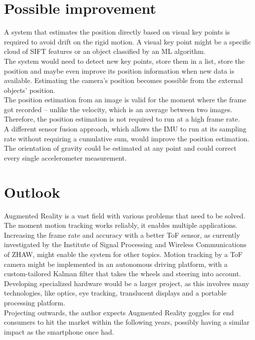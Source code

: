 \section{Possible improvement}
\label{sec:improvement}
A system that estimates the position directly based on visual key points is required to avoid drift on the rigid motion. A visual key point might be a specific cloud of SIFT features or an object classified by an ML algorithm.\\
The system would need to detect new key points, store them in a list, store the position and maybe even improve its position information when new data is available. Estimating the camera's position becomes possible from the external objects' position.\\
The position estimation from an image is valid for the moment where the frame got recorded – unlike the velocity, which is an average between two images. Therefore, the position estimation is not required to run at a high frame rate.\\
A different sensor fusion approach, which allows the IMU to run at its sampling rate without requiring a cumulative sum, would improve the position estimation. The orientation of gravity could be estimated at any point and could correct every single accelerometer measurement.
 

\section{Outlook}
\label{sec:outlook}
Augmented Reality is a vast field with various problems that need to be solved. The moment motion tracking works reliably, it enables multiple applications. Increasing the frame rate and accuracy with a better ToF sensor, as currently investigated by the Institute of Signal Processing and Wireless Communications of ZHAW, might enable the system for other topics. Motion tracking by a ToF camera might be implemented in an autonomous driving platform, with a custom-tailored Kalman filter that takes the wheels and steering into account.\\ 
Developing specialized hardware would be a larger project, as this involves many technologies, like optics, eye tracking, translucent displays and a portable processing platform.\\
Projecting outwards, the author expects Augmented Reality goggles for end consumers to hit the market within the following years, possibly having a similar impact as the smartphone once had. 
